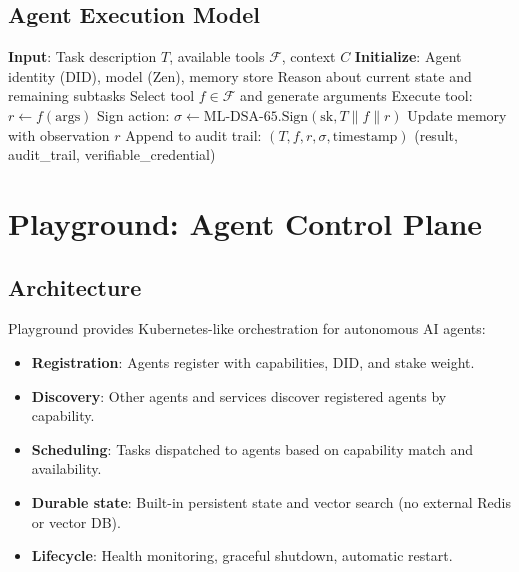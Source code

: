 \documentclass[11pt,letterpaper]{article}
\begin{document}
\subsection{Agent Execution Model}

\begin{algorithm}[H]
\caption{Agent Task Execution}
\begin{algorithmic}[1]
\State \textbf{Input}: Task description $T$, available tools $\mathcal{F}$, context $C$
\State \textbf{Initialize}: Agent identity (DID), model (Zen), memory store
\Repeat
  \State Reason about current state and remaining subtasks
  \State Select tool $f \in \mathcal{F}$ and generate arguments
  \State Execute tool: $r \gets f(\text{args})$
  \State Sign action: $\sigma \gets \text{ML-DSA-65.Sign}(\text{sk}, T \| f \| r)$
  \State Update memory with observation $r$
  \State Append to audit trail: $(T, f, r, \sigma, \text{timestamp})$
\State \Return (result, audit\_trail, verifiable\_credential)
\end{algorithmic}
\end{algorithm}

\section{Playground: Agent Control Plane}

\subsection{Architecture}

Playground provides Kubernetes-like orchestration for autonomous AI agents:

\begin{itemize}
\item \textbf{Registration}: Agents register with capabilities, DID, and stake weight.
\item \textbf{Discovery}: Other agents and services discover registered agents by capability.
\item \textbf{Scheduling}: Tasks dispatched to agents based on capability match and availability.
\item \textbf{Durable state}: Built-in persistent state and vector search (no external Redis or vector DB).
\item \textbf{Lifecycle}: Health monitoring, graceful shutdown, automatic restart.
\end{itemize}
\end{document}
